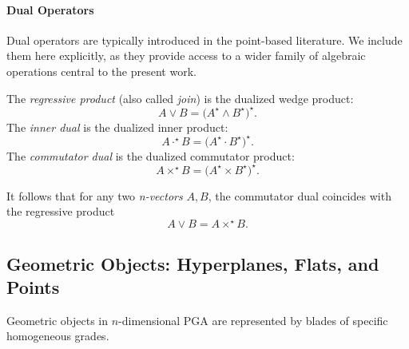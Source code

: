 \documentclass{birkjour}
\theoremstyle{definition}
\theoremstyle{remark}
\begin{document}
\paragraph{Dual Operators}
Dual operators are typically introduced in the point-based literature. We include them here explicitly, as they provide access to a wider family of algebraic operations central to the present work.

\noindent
The \emph{regressive product}
(also called \emph{join}) is the dualized wedge product:
\begin{equation}
  A \vee B = \bigl(A^\star \wedge B^\star\bigr)^\star.
\end{equation}
The \emph{inner dual} is the dualized inner product:
\begin{equation}
  A \cdot^\star B = \bigl(A^\star \cdot B^\star\bigr)^\star.
\end{equation}
The \emph{commutator dual} is the dualized commutator product:
\begin{equation}
  A \times^\star B = \bigl(A^\star \times B^\star\bigr)^\star.
\end{equation}

It follows that for any two \emph{n-vectors} $A, B$, the commutator dual coincides with the regressive product
\begin{equation}
  A \vee B = A \times^\star B.
\end{equation}


\subsection{Geometric Objects: Hyperplanes, Flats, and Points}
\label{sec:objects}

Geometric objects in $n$-dimensional PGA are represented by blades of
specific homogeneous grades.
\end{document}
